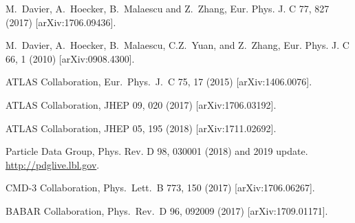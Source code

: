 \begin{thebibliography}{99}

  M.~Davier, A.~Hoecker, B.~Malaescu and Z.~Zhang,
  Eur. Phys. J. C  77, 827 (2017)
[arXiv:1706.09436].

            M.~Davier, A.~Hoecker, B.~Malaescu, C.Z.~Yuan, and Z.~Zhang, 
                              Eur. Phys. J. C 66, 1 (2010) [arXiv:0908.4300].

  ATLAS Collaboration,
  Eur.\ Phys.\ J.\ C 75, 17 (2015)
  [arXiv:1406.0076].
  
ATLAS Collaboration,
  JHEP 09, 020 (2017)
  [arXiv:1706.03192].


  
ATLAS Collaboration,
  JHEP 05, 195 (2018)
  [arXiv:1711.02692].

         Particle Data Group, Phys. Rev. D 98, 030001 (2018) and 2019 update.
                              \url{http://pdglive.lbl.gov}.

CMD-3 Collaboration,
  Phys.\ Lett.\ B 773, 150 (2017)
  [arXiv:1706.06267].
  
BABAR Collaboration,
  Phys.\ Rev.\ D 96, 092009 (2017)
  [arXiv:1709.01171].


\end{thebibliography}
